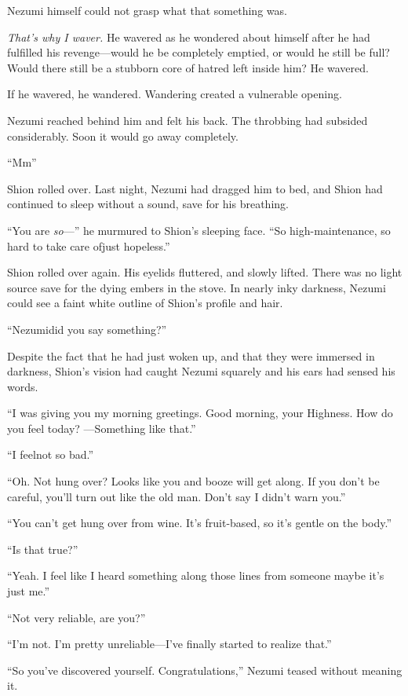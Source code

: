 Nezumi himself could not grasp what that something was.

\emph{That's why I waver.} He wavered as he wondered about himself after he had
fulfilled his revenge---would he be completely emptied, or would he still
be full? Would there still be a stubborn core of hatred left inside him?
He wavered.

If he wavered, he wandered. Wandering created a vulnerable opening.

Nezumi reached behind him and felt his back. The throbbing had subsided
considerably. Soon it would go away completely.

``Mm\el ''

Shion rolled over. Last night, Nezumi had dragged him to bed, and Shion
had continued to sleep without a sound, save for his breathing.

``You are \emph{so}---'' he murmured to Shion's sleeping face. ``So
high-maintenance, so hard to take care of\el just hopeless.''

Shion rolled over again. His eyelids fluttered, and slowly lifted. There
was no light source save for the dying embers in the stove. In nearly
inky darkness, Nezumi could see a faint white outline of Shion's profile
and hair.

``Nezumi\el did you say something?''

Despite the fact that he had just woken up, and that they were immersed
in darkness, Shion's vision had caught Nezumi squarely and his ears had
sensed his words.

``I was giving you my morning greetings. Good morning, your Highness.
How do you feel today? ---Something like that.''

``I feel\el not so bad.''

``Oh. Not hung over? Looks like you and booze will get along. If you
don't be careful, you'll turn out like the old man. Don't say I didn't
warn you.''

``You can't get hung over from wine. It's fruit-based, so it's gentle on
the body.''

``Is that true?''

``Yeah. I feel like I heard something along those lines from someone\el 
maybe it's just me.''

``Not very reliable, are you?''

``I'm not. I'm pretty unreliable---I've finally started to realize that.''

``So you've discovered yourself. Congratulations,'' Nezumi teased
without meaning it.

